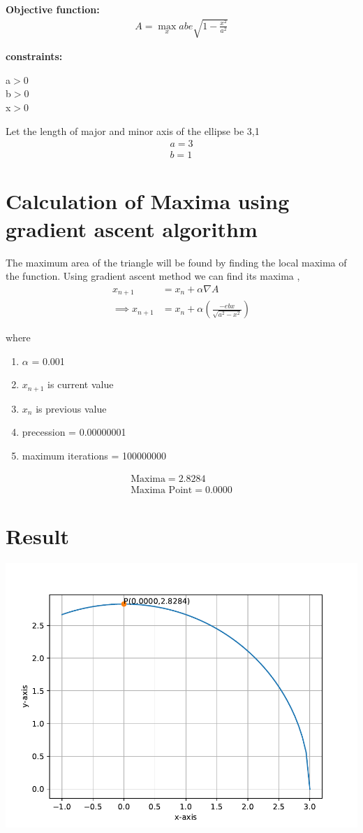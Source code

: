 \documentclass[10pt,twocolumn]{article}
\providecommand{\brak}[1]{\ensuremath{\left(#1\right)}}
\begin{document}
\textbf{Objective function:}
\begin{align}
A=\max_x abe \sqrt{1-\frac{x^2}{a^2}}
\end{align}

\textbf{constraints:}\\
\begin{center}
a$>$0\\b$>$0\\x$>$0
\end{center}
Let the length of major and minor axis of the ellipse be 3,1
\begin{align}
	a = 3
	\\b=1
\end{align}
\section{Calculation of Maxima using gradient ascent algorithm}
The maximum area of the triangle will be found by finding the local maxima of the function.
Using gradient ascent method we can find its maxima ,
    \begin{align}
        x_{n+1} &= x_n + \alpha \nabla A \\
	    \implies x_{n+1} &= x_n + \alpha \brak{\frac{-ebx}{\sqrt{a^2-x^2}}}
    \end{align}

where \\
\begin{enumerate}
\item $\alpha$ = 0.001
\item $x_{n+1}$ is current value
\item $x_{n}$ is previous value
\item precession = 0.00000001
\item maximum iterations = 100000000
\end{enumerate}
\begin{align}
        \boxed{\text{Maxima} = 2.8284}\\
        \boxed{\text{Maxima Point} = 0.0000}
        \end{align}

\section{Result}
   \begin{center}
  \includegraphics[scale=0.5]{opti.pdf}
    \end{center}
\end{document}
